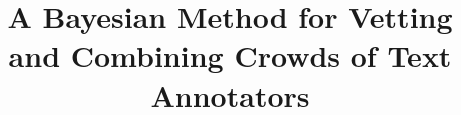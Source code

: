 \documentclass[conference]{IEEEtran}
\title{ 
A Bayesian Method for Vetting and Combining Crowds of Text Annotators
}
\author{\IEEEauthorblockN{Anonymous}
\IEEEauthorblockA{Anonymous, \\
Anonymous \\
Email: anonymous}
\and
\IEEEauthorblockN{Anonymous}
\IEEEauthorblockA{Anonymous, \\
Anonymous \\
Email: anonymous}
\and
\IEEEauthorblockN{Anonymous}
\IEEEauthorblockA{Anonymous, \\
Anonymous \\
Email: anonymous}
}
\begin{document}
\maketitle

\begin{abstract}
\end{abstract}

%
\IEEEpeerreviewmaketitle









%


\end{document}
